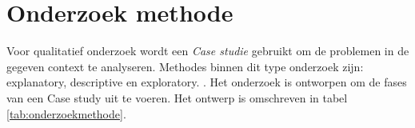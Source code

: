 \begin{comment}
\section{Literatuur} %

Voorbeelden van mogelijk jargon die zullen voorkomen in de thesis zijn data aggregaties, data transformaties en het selecteren en installeren van big data tools. Deze concepten worden onderlegd door onder andere de volgende literatuur:

\begin{itemize}
    \item Data Mining, Concepts and Techniques \parencite{data-mining}
    \item I <3 Logs, Event data, stream processing, and data integration \parencite{logs}
    \item Fast Data Processing with Spark \parencite{spark}
    \item Real-Time Big Data Analytics \parencite{realtime-architectures}
\end{itemize}

Tijdens de selectie wordt mogelijk gebruik gemaakt van verschillende fases uit “de Berenschot-methode” \parencite{cuppen}.
Daarnaast zal tijdens het voeren van gesprekken, interviews en presentaties binnen de organisatie mogelijk gebruik worden gemaakt van de theorie uit “Adviseren als tweede beroep, resultaat bereiken als adviseur” \parencite{adviseren}.
\end{comment}

\newpage
\section{Onderzoek methode} %
\label{sec:onderzoekmethode}


Voor qualitatief onderzoek wordt een \textit{Case studie} gebruikt om de problemen in de gegeven context te analyseren. Methodes binnen dit type onderzoek zijn: explanatory, descriptive en exploratory. \parencite{john-dudovskiy}. Het onderzoek is ontworpen om de fases van een Case study uit te voeren. Het ontwerp is omschreven in tabel \ref{tab:onderzoekmethode}.

